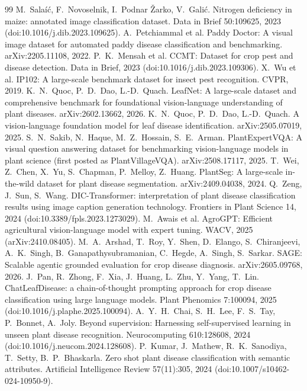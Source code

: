 \documentclass[11pt]{article}
\begin{document}
\begin{thebibliography}{99}
 M.~Sala\'i\'c, F.~Novoselnik, I.~Podnar \v{Z}arko, V.~Gali\'c. Nitrogen deficiency in maize: annotated image classification dataset. Data in Brief 50:109625, 2023 (doi:10.1016/j.dib.2023.109625).
 A.~Petchiammal et al. Paddy Doctor: A visual image dataset for automated paddy disease classification and benchmarking. arXiv:2205.11108, 2022.
 P.~K.~Mensah et al. CCMT: Dataset for crop pest and disease detection. Data in Brief, 2023 (doi:10.1016/j.dib.2023.109306).
 X.~Wu et al. IP102: A large-scale benchmark dataset for insect pest recognition. CVPR, 2019.
 K.~N.~Quoc, P.~D.~Dao, L.-D.~Quach. LeafNet: A large-scale dataset and comprehensive benchmark for foundational vision-language understanding of plant diseases. arXiv:2602.13662, 2026.
 K.~N.~Quoc, P.~D.~Dao, L.-D.~Quach. A vision-language foundation model for leaf disease identification. arXiv:2505.07019, 2025.
 S.~N.~Sakib, N.~Haque, M.~Z.~Hossain, S.~E.~Arman. PlantExpertVQA: A visual question answering dataset for benchmarking vision-language models in plant science (first posted as PlantVillageVQA). arXiv:2508.17117, 2025.
 T.~Wei, Z.~Chen, X.~Yu, S.~Chapman, P.~Melloy, Z.~Huang. PlantSeg: A large-scale in-the-wild dataset for plant disease segmentation. arXiv:2409.04038, 2024.
 Q.~Zeng, J.~Sun, S.~Wang. DIC-Transformer: interpretation of plant disease classification results using image caption generation technology. Frontiers in Plant Science 14, 2024 (doi:10.3389/fpls.2023.1273029).
 M.~Awais et al. AgroGPT: Efficient agricultural vision-language model with expert tuning. WACV, 2025 (arXiv:2410.08405).
 M.~A.~Arshad, T.~Roy, Y.~Shen, D.~Elango, S.~Chiranjeevi, A.~K.~Singh, B.~Ganapathysubramanian, C.~Hegde, A.~Singh, S.~Sarkar. SAGE: Scalable agentic grounded evaluation for crop disease diagnosis. arXiv:2605.09768, 2026.
 J.~Pan, R.~Zhong, F.~Xia, J.~Huang, L.~Zhu, Y.~Yang, T.~Lin. ChatLeafDisease: a chain-of-thought prompting approach for crop disease classification using large language models. Plant Phenomics 7:100094, 2025 (doi:10.1016/j.plaphe.2025.100094).
 A.~Y.~H.~Chai, S.~H.~Lee, F.~S.~Tay, P.~Bonnet, A.~Joly. Beyond supervision: Harnessing self-supervised learning in unseen plant disease recognition. Neurocomputing 610:128608, 2024 (doi:10.1016/j.neucom.2024.128608).
 P.~Kumar, J.~Mathew, R.~K.~Sanodiya, T.~Setty, B.~P.~Bhaskarla. Zero shot plant disease classification with semantic attributes. Artificial Intelligence Review 57(11):305, 2024 (doi:10.1007/s10462-024-10950-9).

\end{thebibliography}
\end{document}
